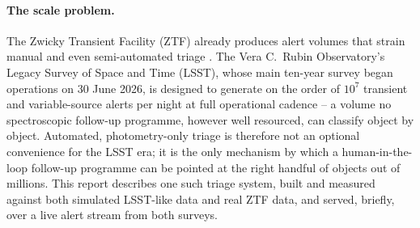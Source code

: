 \paragraph{The scale problem.}
The Zwicky Transient Facility (ZTF) already produces alert volumes that
strain manual and even semi-automated triage
\citep{bellm2019ztf}. The Vera C.\ Rubin Observatory's Legacy Survey of
Space and Time (LSST), whose main ten-year survey began operations on 30
June 2026, is designed to generate on the order of $10^7$ transient and
variable-source alerts per night at full operational cadence
\citep{ivezic2019lsst} -- a volume no spectroscopic follow-up programme,
however well resourced, can classify object by object. Automated,
photometry-only triage is therefore not an optional convenience for the
LSST era; it is the only mechanism by which a human-in-the-loop follow-up
programme can be pointed at the right handful of objects out of millions.
This report describes one such triage system, built and measured against
both simulated LSST-like data and real ZTF data, and served, briefly, over
a live alert stream from both surveys.
